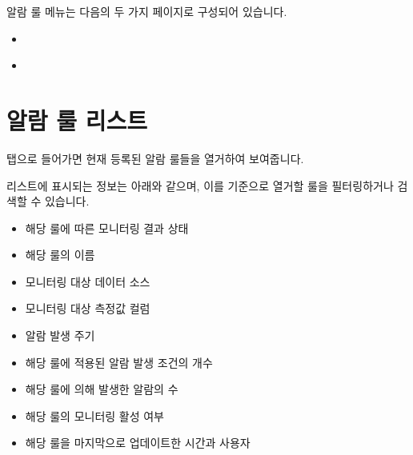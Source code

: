 \documentclass[letterpaper,10pt,english]{sphinxmanual}
\begin{document}
알람 룰 메뉴는 다음의 두 가지 페이지로 구성되어 있습니다.
\begin{itemize}
\item {} 
{\hyperref[\detokenize{part04/index:alarm-rule-list}]{}}

\item {} 
{\hyperref[\detokenize{part04/index:alarm-rule-details}]{}}

\end{itemize}


\section{알람 룰 리스트}
\label{\detokenize{part04/index:alarm-rule-list}}\label{\detokenize{part04/index:id2}}
 탭으로 들어가면 현재 등록된 알람 룰들을 열거하여 보여줍니다.
\begin{quote}

\begin{figure}[H]
\centering

\noindent{}
\end{figure}
\end{quote}

리스트에 표시되는 정보는 아래와 같으며, 이를 기준으로 열거할 룰을 필터링하거나 검색할 수 있습니다.
\begin{itemize}
\item {} 
 해당 룰에 따른 모니터링 결과 상태

\item {} 
 해당 룰의 이름

\item {} 
 모니터링 대상 데이터 소스

\item {} 
 모니터링 대상 측정값 컬럼

\item {} 
 알람 발생 주기

\item {} 
 해당 룰에 적용된 알람 발생 조건의 개수

\item {} 
 해당 룰에 의해 발생한 알람의 수

\item {} 
 해당 룰의 모니터링 활성 여부

\item {} 
 해당 룰을 마지막으로 업데이트한 시간과 사용자

\end{itemize}
\end{document}
